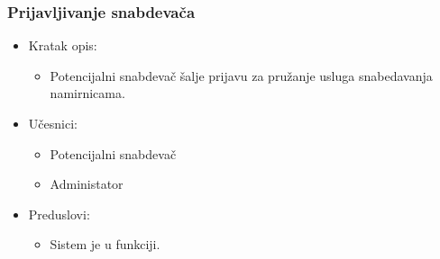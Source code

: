 \subsubsection{Prijavljivanje snabdevača}

\begin{itemize}
	\item Kratak opis:
		\begin{itemize}
			\item Potencijalni snabdevač šalje prijavu za pružanje usluga snabedavanja namirnicama.
		\end{itemize}
	\item Učesnici:
		\begin{itemize}
			\item Potencijalni snabdevač
			\item Administator
		\end{itemize}	
	\item Preduslovi:
		\begin{itemize}
	       \item Sistem je u funkciji.
		\end{itemize}	


\end{itemize}
